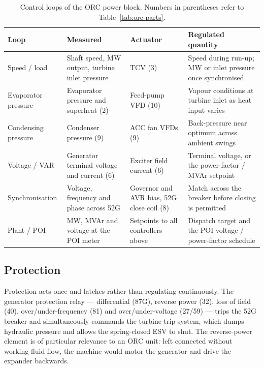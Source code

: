 \begin{table}[htbp]
  \centering
  \small
  \renewcommand{\arraystretch}{1.25}
  \begin{tabularx}{\linewidth}{@{}p{2.1cm} p{3.2cm} p{3.7cm} X@{}}
    \toprule
    \textbf{Loop} & \textbf{Measured} & \textbf{Actuator} &
    \textbf{Regulated quantity} \\
    \midrule
    Speed / load         & Shaft speed, MW output, turbine inlet pressure
                         & TCV (3)
                         & Speed during run-up; MW or inlet pressure once
                           synchronised \\
    Evaporator pressure  & Evaporator pressure and superheat (2)
                         & Feed-pump VFD (10)
                         & Vapour conditions at turbine inlet as heat input
                           varies \\
    Condensing pressure  & Condenser pressure (9)
                         & ACC fan VFDs (9)
                         & Back-pressure near optimum across ambient swings \\
    Voltage / VAR        & Generator terminal voltage and current (6)
                         & Exciter field current (6)
                         & Terminal voltage, or the power-factor / MVAr
                           setpoint \\
    Synchronisation      & Voltage, frequency and phase across 52G
                         & Governor and AVR bias, 52G close coil (8)
                         & Match across the breaker before closing is
                           permitted \\
    Plant / POI          & MW, MVAr and voltage at the POI meter
                         & Setpoints to all controllers above
                         & Dispatch target and the POI voltage / power-factor
                           schedule \\
    \bottomrule
  \end{tabularx}
  \caption{Control loops of the ORC power block. Numbers in parentheses refer
           to Table~\ref{tab:orc-parts}.}
  \label{tab:orc-loops}
\end{table}

\subsection{Protection}
Protection acts once and latches rather than regulating continuously. The
generator protection relay --- differential (87G), reverse power (32), loss of
field (40), over/under-frequency (81) and over/under-voltage (27/59) --- trips
the 52G breaker and simultaneously commands the turbine trip system, which dumps
hydraulic pressure and allows the spring-closed ESV to shut. The reverse-power
element is of particular relevance to an ORC unit: left connected without
working-fluid flow, the machine would motor the generator and drive the
expander backwards.

